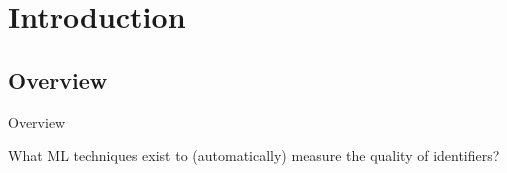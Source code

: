 




\maketitle


\section*{Introduction}
\label{sec:Introduction}

\subsection{Overview}
\label{ssec:Overview}

\begin{frame}{Overview}
    \vfill
    \begin{m-question}
        What \acl{ML} techniques exist to (automatically) measure the quality of
        identifiers?
    \end{m-question}
    \vfill
\end{frame}

